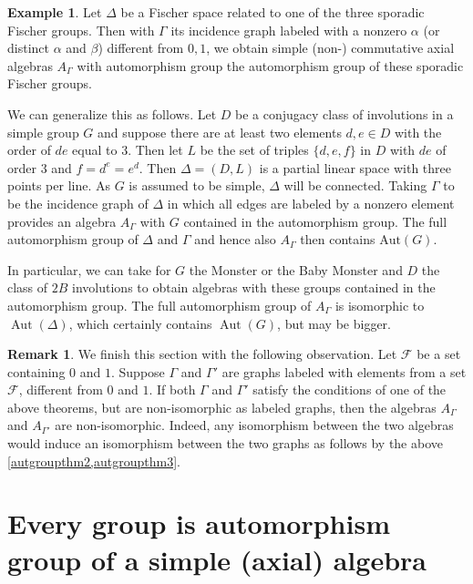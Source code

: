 \documentclass[oneside,a4paper]{amsart} %
\theoremstyle{definition}
\newtheorem{example}[proposition]{Example}
\newtheorem{remark}[proposition]{Remark}
\DeclareMathOperator{\Aut}{\mathrm{Aut}}
\begin{document}
\begin{example}
Let $\Delta$ be a Fischer space related to one of the three sporadic Fischer groups. 
Then with $\Gamma$ its incidence graph labeled with a nonzero $\alpha$ (or distinct $\alpha$ and $\beta$) different from $0,1$, we obtain simple
(non-) commutative axial algebras $A_\Gamma$ with automorphism group 
the automorphism group of these sporadic Fischer groups. 

We can generalize this as follows. Let $D$ be a conjugacy class of involutions in a simple group $G$ and suppose there are at least two elements
$d,e\in D$ with the order of $de$ equal to $3$.
Then let $L$ be the set of triples $\{d,e,f\}$ in $D$ with $de$ of order $3$ and $f=d^e=e^d$.
Then $\Delta=(D,L)$ is a partial linear space with three points per line.
As $G$ is assumed to be simple, $\Delta$ will be connected.
Taking $\Gamma$ to be the incidence graph of $\Delta$ in which all edges are labeled by a nonzero element provides an algebra
$A_\Gamma$ with $G$ contained in the automorphism group.
The full automorphism group of $\Delta$ and $\Gamma$ and hence also $A_\Gamma$  then contains $\mathrm{Aut}(G)$.

In particular, we can take for $G$ the Monster or the Baby Monster and $D$ the class of $2B$ involutions to obtain
algebras with these groups contained in the automorphism group.
The full automorphism group of $A_\Gamma$ is isomorphic to $\Aut(\Delta)$, which certainly contains $\Aut(G)$, but may be bigger.
\end{example}


\begin{remark}
We finish this section with the following observation.
Let $\mathcal{F}$ be a set containing $0$ and $1$.
Suppose $\Gamma$ and $\Gamma'$ are graphs labeled with elements from a set $\mathcal{F}$, different from $0$ and $1$.
If both $\Gamma$ and $\Gamma'$ satisfy the conditions of one of the above theorems, but are non-isomorphic as labeled graphs,
then the algebras $A_\Gamma$ and $A_{\Gamma'}$ are non-isomorphic.
Indeed, any isomorphism between the two algebras would induce an isomorphism between the two graphs as follows by  the above \cref{autgroupthm2,autgroupthm3}.
\end{remark}

\section{Every group is automorphism group of a  simple (axial) algebra}
\label{section:frucht}
\end{document}
